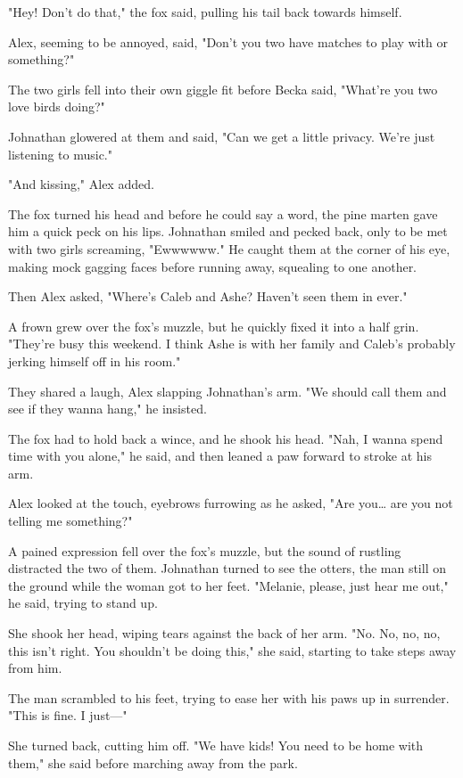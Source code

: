 "Hey! Don't do that," the fox said, pulling his tail back towards himself.

Alex, seeming to be annoyed, said, "Don't you two have matches to play with or something?"

The two girls fell into their own giggle fit before Becka said, "What're you two love birds doing?"

Johnathan glowered at them and said, "Can we get a little privacy. We're just listening to music."

"And kissing," Alex added.

The fox turned his head and before he could say a word, the pine marten gave him a quick peck on his lips. Johnathan smiled and pecked back, only to be met with two girls screaming, "Ewwwwww." He caught them at the corner of his eye, making mock gagging faces before running away, squealing to one another.

Then Alex asked, "Where's Caleb and Ashe? Haven't seen them in ever."

A frown grew over the fox's muzzle, but he quickly fixed it into a half grin. "They're busy this weekend. I think Ashe is with her family and Caleb's probably jerking himself off in his room."

They shared a laugh, Alex slapping Johnathan's arm. "We should call them and see if they wanna hang," he insisted.

The fox had to hold back a wince, and he shook his head. "Nah, I wanna spend time with you alone," he said, and then leaned a paw forward to stroke at his arm.

Alex looked at the touch, eyebrows furrowing as he asked, "Are you\ldots{} are you not telling me something?"

A pained expression fell over the fox's muzzle, but the sound of rustling distracted the two of them. Johnathan turned to see the otters, the man still on the ground while the woman got to her feet. "Melanie, please, just hear me out," he said, trying to stand up.

She shook her head, wiping tears against the back of her arm. "No. No, no, no, this isn't right. You shouldn't be doing this," she said, starting to take steps away from him.

The man scrambled to his feet, trying to ease her with his paws up in surrender. "This is fine. I just---"

She turned back, cutting him off. "We have kids! You need to be home with them," she said before marching away from the park.

